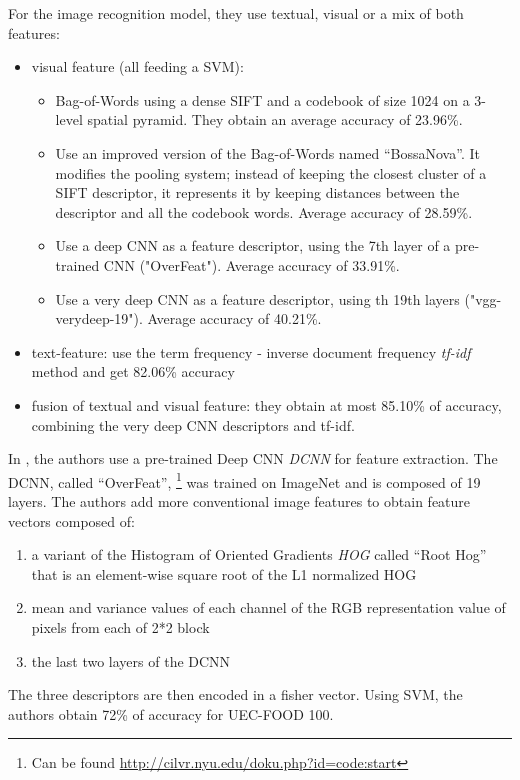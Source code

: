 For the image recognition model, they use textual, visual or a mix of both features:
\begin{itemize}
    \item visual feature (all feeding a SVM):
    \begin{itemize}
        \item Bag-of-Words using a dense SIFT and a codebook of size 1024 on a 3-level spatial pyramid. They obtain an average accuracy of 23.96\%.
        
        \item Use an improved version of the Bag-of-Words named \enquote{BossaNova}. It modifies the pooling system; instead of keeping the closest cluster of a SIFT descriptor, it represents it by keeping distances between the descriptor and all the codebook words. Average accuracy of 28.59\%.
        
        \item Use a deep CNN as a feature descriptor, using the 7th layer of a pre-trained CNN ("OverFeat"). Average accuracy of 33.91\%.
        
        \item Use a very deep CNN as a feature descriptor, using th 19th layers ("vgg-verydeep-19"). Average accuracy of 40.21\%.
    \end{itemize}
    
    \item text-feature: use the term frequency - inverse document frequency \textit{tf-idf} method and get 82.06\% accuracy
    
    \item fusion of textual and visual feature: they obtain at most 85.10\% of accuracy, combining the very deep CNN descriptors and tf-idf.
\end{itemize}


In \cite{Kawano2014}, the authors use a pre-trained Deep CNN \textit{DCNN} for feature extraction. The DCNN, called \enquote{OverFeat}, \footnote{Can be found \url{http://cilvr.nyu.edu/doku.php?id=code:start}} was trained on ImageNet and is composed of 19 layers. The authors add more conventional image features to obtain feature vectors composed of: 
\begin{enumerate}
    \item a variant of the Histogram of Oriented Gradients \textit{HOG} called \enquote{Root Hog} that is an element-wise square root of the L1 normalized HOG
    \item mean and variance values of each channel of the RGB representation value of pixels from each of 2*2  block
    \item the last two layers of the DCNN
\end{enumerate}
The three descriptors are then encoded in a fisher vector. Using SVM, the authors obtain 72\% of  accuracy for UEC-FOOD 100.

